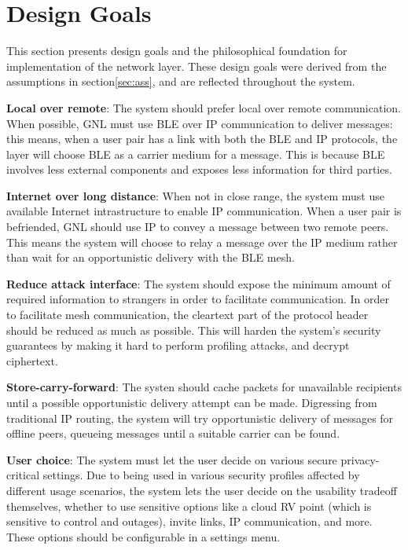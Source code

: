 \section{Design Goals}
\label{sec:des}
This section presents design goals and the philosophical foundation for implementation of the network layer. These design goals were derived from the assumptions in section\ref{sec:ass}, and are reflected throughout the system.

\textbf{Local over remote}: The system should prefer local over remote communication.
When possible, GNL must use BLE over IP communication to deliver messages: this means, when a user pair has a link with both the BLE and IP protocols, the layer will choose BLE as a carrier medium for a message. This is because BLE involves less external components and exposes less information for third parties.

\textbf{Internet over long distance}: When not in close range, the system must use available Internet intrastructure to enable IP communication.
When a user pair is befriended, GNL should use IP to convey a message between two remote peers. This means the system will choose to relay a message over the IP medium rather than wait for an opportunistic delivery with the BLE mesh.

\textbf{Reduce attack interface}: The system should expose the minimum amount of required information to strangers in order to facilitate communication.
In order to facilitate mesh communication, the cleartext part of the protocol header should be reduced as much as possible. This will harden the system's security guarantees by making it hard to perform profiling attacks, and decrypt ciphertext.

\textbf{Store-carry-forward}: The systen should cache packets for unavailable recipients until a possible opportunistic delivery attempt can be made.
Digressing from traditional IP routing, the system will try opportunistic delivery of messages for offline peers, queueing messages until a suitable carrier can be found.

\textbf{User choice}: The system must let the user decide on various secure privacy-critical settings.
Due to being used in various security profiles affected by different usage scenarios, the system lets the user decide on the usability tradeoff themselves, whether to use sensitive options like a cloud RV point (which is sensitive to control and outages), invite links, IP communication, and more. These options should be configurable in a settings menu.